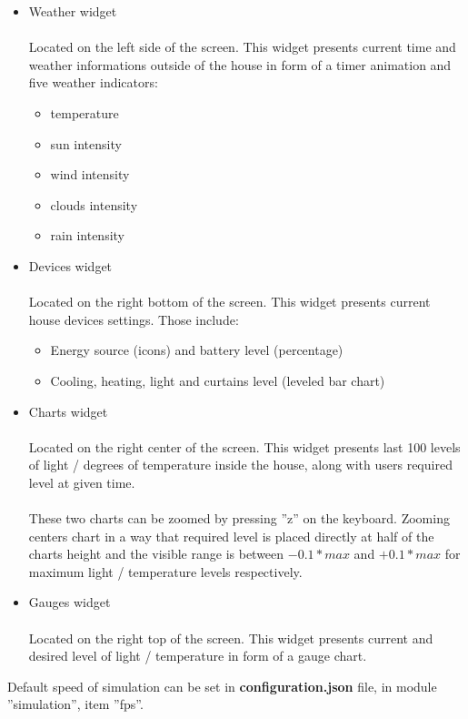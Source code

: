 \documentclass{article}
\begin{document}
\begin{itemize}
    \item Weather widget \\\\
    Located on the left side of the screen. This widget presents current time and weather informations outside of the house in form of a timer animation and five weather indicators: 
    \begin{itemize}
        \item temperature
        \item sun intensity
        \item wind intensity
        \item clouds intensity
        \item rain intensity
    \end{itemize}
    \item Devices widget \\\\
    Located on the right bottom of the screen. This widget presents current house devices settings. Those include:
    \begin{itemize}
       \item Energy source (icons) and battery level (percentage)
       \item Cooling, heating, light and curtains level (leveled bar chart) 
    \end{itemize}
    \item Charts widget \\\\
    Located on the right center of the screen. This widget presents last 100 levels of light / degrees of temperature inside the house, along with users required level at given time. \\\\
    These two charts can be zoomed by pressing ''z'' on the keyboard. Zooming centers chart in a way that required level is placed directly at half of the charts height and the visible range is between $-0.1 * max$ and $+0.1 * max$ for maximum light / temperature levels respectively.
    \item Gauges widget \\\\
    Located on the right top of the screen. This widget presents current and desired level of light / temperature in form of a gauge chart.
\end{itemize}

Default speed of simulation can be set in \textbf{configuration.json} file, in module ''simulation'', item ''fps''.
\end{document}
